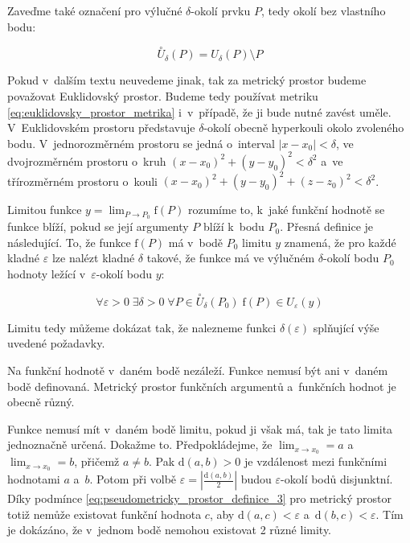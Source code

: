 Zaveďme také označení pro výlučné \(\delta\)-okolí prvku \(P\), tedy okolí bez vlastního bodu:

\begin{equation}
\overset{\circ}{U}_{\delta}(P) = U_{\delta}(P) \setminus P
\end{equation}

Pokud v~dalším textu neuvedeme jinak, tak za metrický prostor budeme považovat Euklidovský prostor. Budeme tedy používat metriku \eqref{eq:euklidovsky_prostor_metrika} i~v~případě, že ji bude nutné zavést uměle. V~Euklidovském prostoru představuje  \(\delta\)-okolí obecně hyperkouli okolo zvoleného bodu. V~jednorozměrném prostoru se jedná o~interval \(|x - x_0| < \delta\), ve dvojrozměrném prostoru o~kruh \((x - x_0)^2 + (y - y_0)^2 < \delta^2\) a~ve třírozměrném prostoru o~kouli \((x - x_0)^2 + (y - y_0)^2 + (z - z_0)^2 < \delta^2\).

Limitou funkce \(y = \lim_{P \to P_0} \mathrm{f}(P)\) rozumíme to, k~jaké funkční hodnotě se funkce blíží, pokud se její argumenty \(P\) blíží k~bodu \(P_0\). Přesná definice je následující. To, že funkce \(\mathrm{f}(P)\) má v~bodě \(P_0\) limitu \(y\) znamená, že pro každé kladné \(\varepsilon\) lze nalézt kladné \(\delta\) takové, že funkce má ve výlučném \(\delta\)-okolí bodu \(P_0\) hodnoty ležící v~\(\varepsilon\)-okolí bodu \(y\):

\begin{equation}
\forall \varepsilon > 0 \; \exists \delta > 0 \; \forall P \in \overset{\circ}{U}_{\delta}(P_0) \; \mathrm{f}(P) \in U_{\varepsilon}(y)
\end{equation}

Limitu tedy můžeme dokázat tak, že nalezneme funkci \(\delta(\varepsilon)\) splňující výše uvedené požadavky.

Na funkční hodnotě v~daném bodě nezáleží. Funkce nemusí být ani v~daném bodě definovaná. Metrický prostor funkčních argumentů a~funkčních hodnot je obecně různý.

Funkce nemusí mít v~daném bodě limitu, pokud ji však má, tak je tato limita jednoznačně určená. Dokažme to. Předpokládejme, že \(\lim_{x \to x_0} = a\) a~\(\lim_{x \to x_0} = b\), přičemž \(a \neq b\). Pak \(\mathrm{d}(a, b) > 0\) je vzdálenost mezi funkčními hodnotami \(a\) a~\(b\). Potom při volbě \(\varepsilon = \left| \frac{\mathrm{d}(a, b)}{2} \right|\) budou \(\varepsilon\)-okolí bodů disjunktní. Díky podmínce \eqref{eq:pseudometricky_prostor_definice_3} pro metrický prostor totiž nemůže existovat funkční hodnota \(c\), aby \(\mathrm{d}(a, c) < \varepsilon\) a~\(\mathrm{d}(b, c) < \varepsilon\). Tím je dokázáno, že v~jednom bodě nemohou existovat 2 různé limity.

